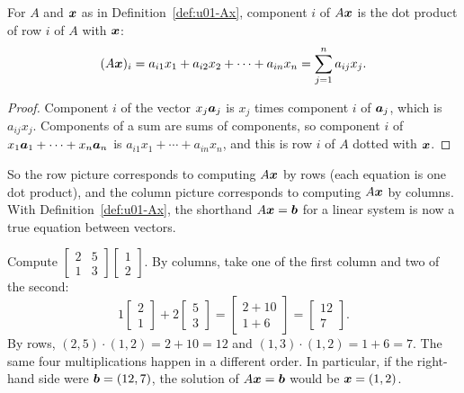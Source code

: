 \begin{proposition}\label{prop:u01-rows}
For $A$ and $\boldsymbol{x}$ as in Definition~\ref{def:u01-Ax}, component $i$ of $A\boldsymbol{x}$ is the
dot product of row $i$ of $A$ with $\boldsymbol{x}$:
\[
  (A\boldsymbol{x})_i = a_{i1}x_1 + a_{i2}x_2 + \cdots + a_{in}x_n = \sum_{j=1}^{n} a_{ij}x_j .
\]
\end{proposition}

\begin{proof}
Component $i$ of the vector $x_j\boldsymbol{a}_j$ is $x_j$ times component $i$ of $\boldsymbol{a}_j$, which
is $a_{ij}x_j$. Components of a sum are sums of components, so component $i$ of
$x_1\boldsymbol{a}_1+\cdots+x_n\boldsymbol{a}_n$ is $a_{i1}x_1+\cdots+a_{in}x_n$, and this is row $i$ of $A$
dotted with $\boldsymbol{x}$.
\end{proof}

So the row picture corresponds to computing $A\boldsymbol{x}$ by rows (each equation is one dot
product), and the column picture corresponds to computing $A\boldsymbol{x}$ by columns. With
Definition~\ref{def:u01-Ax}, the shorthand $A\boldsymbol{x}=\boldsymbol{b}$ for a linear system is now a true
equation between vectors.

\begin{example}\label{ex:u01-both-ways}
Compute $\begin{bmatrix} 2 & 5\\ 1 & 3\end{bmatrix}\begin{bmatrix} 1\\ 2\end{bmatrix}$.
By columns, take one of the first column and two of the second:
\[
  1\begin{bmatrix} 2\\ 1\end{bmatrix} + 2\begin{bmatrix} 5\\ 3\end{bmatrix}
  = \begin{bmatrix} 2+10\\ 1+6\end{bmatrix} = \begin{bmatrix} 12\\ 7\end{bmatrix}.
\]
By rows, $(2,5)\cdot(1,2) = 2+10 = 12$ and $(1,3)\cdot(1,2)=1+6=7$. The same four
multiplications happen in a different order. In particular, if the right-hand side were
$\boldsymbol{b}=(12,7)$, the solution of $A\boldsymbol{x}=\boldsymbol{b}$ would be $\boldsymbol{x}=(1,2)$.
\end{example}

